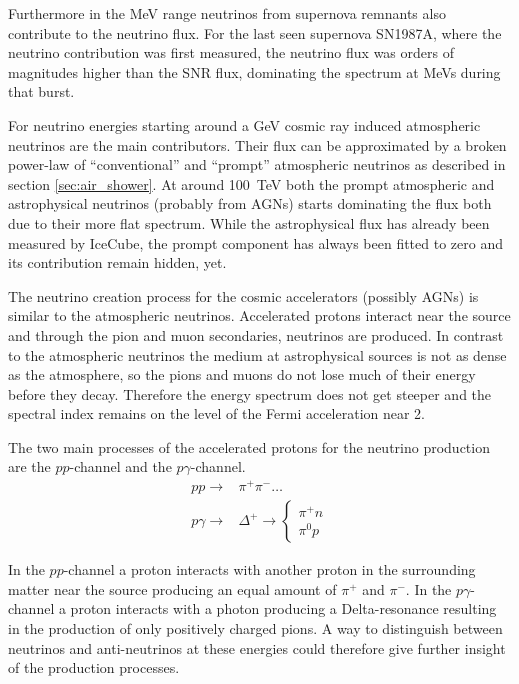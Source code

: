 Furthermore in the MeV range neutrinos from supernova remnants also contribute to the neutrino flux.
For the last seen supernova SN1987A, where the neutrino contribution was first measured, the neutrino flux was orders of magnitudes higher than the SNR flux, dominating the spectrum at MeVs during that burst.

For neutrino energies starting around a GeV cosmic ray induced atmospheric neutrinos are the main contributors.
Their flux can be approximated by a broken power-law of \enquote{conventional} and \enquote{prompt} atmospheric neutrinos as described in section \ref{sec:air_shower}.
At around \SI{100}{TeV} both the prompt atmospheric and astrophysical neutrinos (probably from AGNs) starts dominating the flux both due to their more flat spectrum.
While the astrophysical flux has already been measured by IceCube, the prompt component has always been fitted to zero and its contribution remain hidden, yet.

The neutrino creation process for the cosmic accelerators (possibly AGNs) is similar to the atmospheric neutrinos.
Accelerated protons interact near the source and through the pion and muon secondaries, neutrinos are produced.
In contrast to the atmospheric neutrinos the medium at astrophysical sources is not as dense as the atmosphere, so the pions and muons do not lose much of their energy before they decay.
Therefore the energy spectrum does not get steeper and the spectral index remains on the level of the Fermi acceleration near 2.

The two main processes of the accelerated protons for the neutrino production are the $pp$-channel and the $p\gamma$-channel.
\begin{align}
    p p \to & \pi^+ \pi^- \dots \\
    p \gamma \to & \Delta^+ \to \begin{cases} \pi^+ n \\ \pi^0 p \end{cases}
\end{align}

In the $pp$-channel a proton interacts with another proton in the surrounding matter near the source producing an equal amount of $\pi^+$ and $\pi^-$.
In the $p\gamma$-channel a proton interacts with a photon producing a Delta-resonance resulting in the production of only positively charged pions.
A way to distinguish between neutrinos and anti-neutrinos at these energies could therefore give further insight of the production processes.

